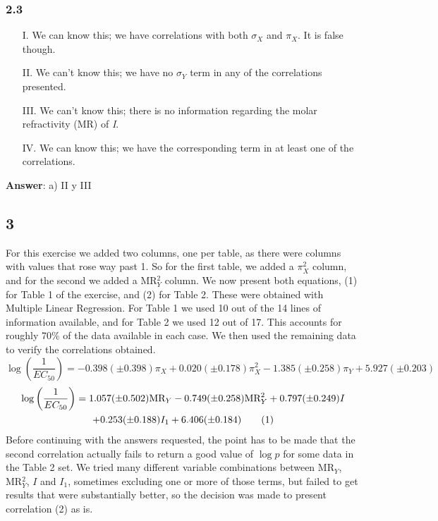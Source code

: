 \documentclass[a4paper, 12pt, notitlepage]{article}
\newcommand\numberthis{\addtocounter{equation}{1}\tag{\theequation}}
\begin{document}
\subsubsection*{2.3}
\begin{itemize}
	\item[I.] We can know this; we have correlations with both $\sigma_X$ and $\pi_X$. It is false though.
	\item[II.] We can't know this; we have no $\sigma_Y$ term in any of the correlations presented.
	\item[III.] We can't know this; there is no information regarding the molar refractivity (MR) of \textit{I}.
	\item[IV.] We can know this; we have the corresponding term in at least one of the correlations.
\end{itemize}
\textbf{Answer}: a) II y III

\subsection*{3}
For this exercise we added two columns, one per table, as there were columns with values that rose way past 1. So for the first table, we added a $\pi_X^2$ column, and for the second we added a MR$_Y^2$ column. We now present both equations, (1) for Table 1 of the exercise, and (2) for Table 2. These were obtained with Multiple Linear Regression. For Table 1 we used 10 out of the 14 lines of information available, and for Table 2 we used 12 out of 17. This accounts for roughly 70\% of the data available in each case. We then used the remaining data to verify the correlations obtained.
\begin{equation}
	\log\left(\frac{1}{EC_{50}}\right) = -0.398(\pm 0.398)\pi_X + 0.020(\pm 0.178)\pi_X^2 - 1.385(\pm 0.258)\pi_Y + 5.927(\pm 0.203)
\end{equation}
\begin{gather*}
	\log\left(\frac{1}{EC_{50}}\right) = 1.057(\pm 0.502)\text{MR}_Y - 0.749(\pm 0.258)\text{MR}_Y^2 + 0.797(\pm 0.249)I \\ + 0.253(\pm 0.188)I_1 + 6.406(\pm 0.184) \numberthis
\end{gather*}
Before continuing with the answers requested, the point has to be made that the second correlation actually fails to return a good value of $\log p$ for some data in the Table 2 set. We tried many different variable combinations between MR$_Y$, MR$_Y^2$, $I$ and $I_1$, sometimes excluding one or more of those terms, but failed to get results that were substantially better, so the decision was made to present correlation (2) as is.
\end{document}
